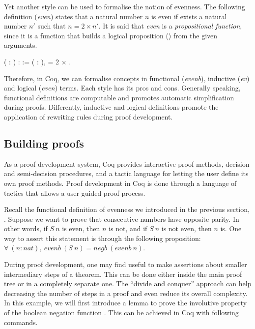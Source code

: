 Yet another style can be used to formalise the notion of evenness. The following definition (\emph{even}) states that a natural number $n$ is even if exists a natural number $n'$ such that $n = 2 \times n'$. It is said that \emph{even} is a \emph{propositional function}, since it is a function that builds a logical proposition () from the given arguments.

\begin{coqdoccode}
	\coqdocnoindent
	  ( : ) :  :=\coqdoceol
	\coqdocindent{1.00em}
	\coqdoctac{\ensuremath{\exists}} ( : ),  = 2 \ensuremath{\times} .\coqdoceol
\end{coqdoccode}

Therefore, in Coq, we can formalise concepts in functional (\emph{evenb}), inductive (\emph{ev}) and logical (\emph{even}) terms. Each style has its pros and cons. Generally speaking, functional definitions are computable and promotes automatic simplification during proofs. Differently, inductive and logical definitions promote the application of rewriting rules during proof development.

\subsection{Building proofs}

As a proof development system, Coq provides interactive proof methods, decision and semi-decision procedures, and a tactic language for letting the user define its own proof methods. Proof development in Coq is done through a language of tactics that allows a user-guided proof process.

Recall the functional definition of evenness we introduced in the previous section, . Suppose we want to prove that consecutive numbers have opposite parity. In other words, if $ S \ n $ is even, then $ n $ is not, and if $ S \ n $ is not even, then $ n $ is. One way to assert this statement is through the following proposition: $ \forall \ (n:nat), \ evenb \ (S \ n) = negb \ (evenb \ n) $.

During proof development, one may find useful to make assertions about smaller intermediary steps of a theorem. This can be done either inside the main proof tree or in a completely separate one. The ``divide and conquer'' approach can help decreasing the number of steps in a proof and even reduce its overall complexity. In this example, we will first introduce a lemma to prove the involutive property of the boolean negation function . This can be achieved in Coq with following commands.

